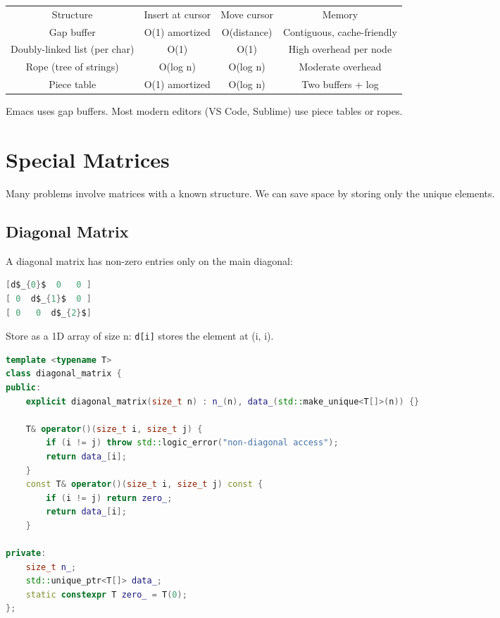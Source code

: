 \begin{center}
\begin{tabular}{cccc}
\toprule
Structure & Insert at cursor & Move cursor & Memory \\
Gap buffer & O(1) amortized & O(distance) & Contiguous, cache-friendly \\
Doubly-linked list (per char) & O(1) & O(1) & High overhead per node \\
Rope (tree of strings) & O(log n) & O(log n) & Moderate overhead \\
Piece table & O(1) amortized & O(log n) & Two buffers + log \\
\bottomrule
\end{tabular}
\end{center}

Emacs uses gap buffers. Most modern editors (VS Code, Sublime) use piece tables or ropes.

\section{Special Matrices}

Many problems involve matrices with a known structure. We can save space by storing only the unique elements.

\subsection{Diagonal Matrix}

A diagonal matrix has non-zero entries only on the main diagonal:

\begin{lstlisting}[language=Java]
[d$_{0}$  0   0 ]
[ 0  d$_{1}$  0 ]
[ 0   0  d$_{2}$]
\end{lstlisting}

Store as a 1D array of size n: \texttt{d[i]} stores the element at (i, i).

\begin{lstlisting}[language=C++]
template <typename T>
class diagonal_matrix {
public:
    explicit diagonal_matrix(size_t n) : n_(n), data_(std::make_unique<T[]>(n)) {}

    T& operator()(size_t i, size_t j) {
        if (i != j) throw std::logic_error("non-diagonal access");
        return data_[i];
    }
    const T& operator()(size_t i, size_t j) const {
        if (i != j) return zero_;
        return data_[i];
    }

private:
    size_t n_;
    std::unique_ptr<T[]> data_;
    static constexpr T zero_ = T(0);
};
\end{lstlisting}

